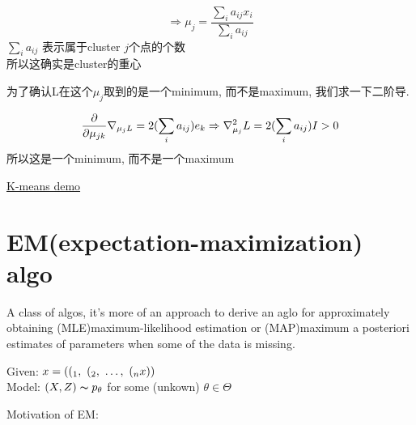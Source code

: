 \documentclass{article}
\begin{document}
$$
\Rightarrow
\mu_j = \dfrac{\sum_i a_{ij}x_i}{\sum_i a_{ij}}
$$
$\sum_i a_{ij}$  表示属于cluster $j$个点的个数\\
所以这确实是cluster的重心

为了确认L在这个$\mu_j$取到的是一个minimum, 而不是maximum, 我们求一下二阶导.

$$
\frac{\partial }{\partial \mu_{jk}} \nabla _{\mu_{j} L}
= 2(\sum_i a_{ij}) e_k
\Rightarrow
\nabla ^2_{\mu_j} L = 2(\sum_i a_{ij})I > 0
$$
所以这是一个minimum, 而不是一个maximum

\href{https://www.youtube.com/watch?v=zHbxbb2ye3E}{K-means demo}

\section{EM(expectation-maximization) algo}
A class of algos,
it's more of an approach to derive an aglo for approximately obtaining (MLE)maximum-likelihood estimation or (MAP)maximum a posteriori estimates of parameters
when some of the data is missing.

Given: $x = ((_1,~(_2,~\ldots,~(_nx))$\\
Model: $(X, Z) \thicksim{p}_\theta$ for some (unkown) $\theta \in \Theta$

Motivation of EM:
\end{document}
